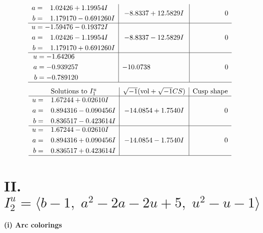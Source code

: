 \documentclass[1p]{elsarticle_modified}
\theoremstyle{definition}
\newcommand{\I}{\sqrt{-1}}
\begin{document}
$$\begin{array}{c|c|c}
\begin{aligned}
a &= \phantom{-}1.02426 + 1.19954 I \\
b &= \phantom{-}1.179170 - 0.691260 I\end{aligned}
 & -8.8337 + 12.5829 I & \phantom{-0.000000 } 0 \\ \hline\begin{aligned}
u &= -1.59476 - 0.19372 I \\
a &= \phantom{-}1.02426 - 1.19954 I \\
b &= \phantom{-}1.179170 + 0.691260 I\end{aligned}
 & -8.8337 - 12.5829 I & \phantom{-0.000000 } 0 \\ \hline\begin{aligned}
u &= -1.64206\phantom{ +0.000000I} \\
a &= -0.939257\phantom{ +0.000000I} \\
b &= -0.789120\phantom{ +0.000000I}\end{aligned}
 & -10.0738\phantom{ +0.000000I} & \phantom{-0.000000 } 0\\
 \hline 
 \end{array}$$\newpage$$\begin{array}{c|c|c}  
\text{Solutions to }I^u_{1}& \I (\text{vol} + \sqrt{-1}CS) & \text{Cusp shape}\\
 \hline 
\begin{aligned}
u &= \phantom{-}1.67244 + 0.02610 I \\
a &= \phantom{-}0.894316 - 0.090456 I \\
b &= \phantom{-}0.836517 - 0.423614 I\end{aligned}
 & -14.0854 + 1.7540 I & \phantom{-0.000000 } 0 \\ \hline\begin{aligned}
u &= \phantom{-}1.67244 - 0.02610 I \\
a &= \phantom{-}0.894316 + 0.090456 I \\
b &= \phantom{-}0.836517 + 0.423614 I\end{aligned}
 & -14.0854 - 1.7540 I & \phantom{-0.000000 } 0\\
 \hline 
 \end{array}$$\newpage\newpage\renewcommand{\arraystretch}{1}
\centering \section*{II. $I^u_{2}= \langle b-1,\;a^2-2 a-2 u+5,\;u^2- u-1 \rangle$}
\flushleft \textbf{(i) Arc colorings}\\
\end{document}
